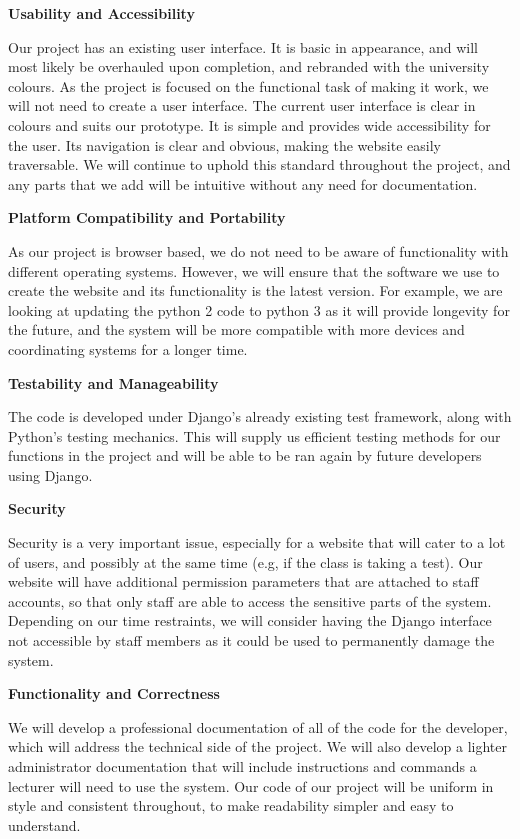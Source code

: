 \documentclass[12pt]{article}
\begin{document}
	\newpage
	
    \textbf{Usability and Accessibility}   

Our project has an existing user interface. It is basic in appearance, and will most likely be overhauled upon completion, and rebranded with the university colours. As the project is focused on the functional task of making it work, we will not need to create a user interface. The current user interface is clear in colours and suits our prototype. It is simple and provides wide accessibility for the user. Its navigation is clear and obvious, making the website easily traversable. We will continue to uphold this standard throughout the project, and any parts that we add will be intuitive without any need for documentation. 

	\textbf{Platform Compatibility and Portability  }     

As our project is browser based, we do not need to be aware of functionality with different operating systems. However, we will ensure that the software we use to create the website and its functionality is the latest version. For example, we are looking at updating the python 2 code to python 3 as it will provide longevity for the future, and the system will be more compatible with more devices and coordinating systems for a longer time.

	\textbf{Testability and Manageability}    

The code is developed under Django’s already existing test framework, along with Python’s testing mechanics. This will supply us efficient testing methods for our functions in the project and will be able to be ran again by future developers using Django. 

	\textbf{Security}    

Security is a very important issue, especially for a website that will cater to a lot of users, and possibly at the same time (e.g, if the class is taking a test). Our website will have additional permission parameters that are attached to staff accounts, so that only staff are able to access the sensitive parts of the system. Depending on our time restraints, we will consider having the Django interface not accessible by staff members as it could be used to permanently damage the system.
    
    \textbf{Functionality and Correctness}

We will develop a professional documentation of all of the code for the developer, which will address the technical side of the project. We will also develop a lighter administrator documentation that will include instructions and commands a lecturer will need to use the system. Our code of our project will be uniform in style and consistent throughout, to make readability simpler and easy to understand.
\end{document}
